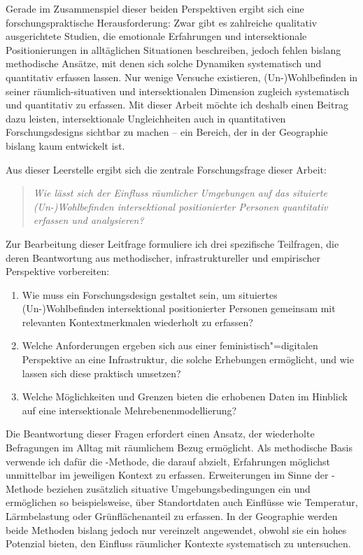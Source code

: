 Gerade im Zusammenspiel dieser beiden Perspektiven ergibt sich eine forschungspraktische Herausforderung: Zwar gibt es zahlreiche qualitativ ausgerichtete Studien, die emotionale Erfahrungen und intersektionale Positionierungen in alltäglichen Situationen beschreiben, jedoch fehlen bislang methodische Ansätze, mit denen sich solche Dynamiken systematisch und quantitativ erfassen lassen. Nur wenige Versuche existieren,  (Un\nobreakdash-)Wohl\-be\-find\-en in seiner räumlich-situativen und intersektionalen Dimension zugleich systematisch und quantitativ zu erfassen. Mit dieser Arbeit möchte ich deshalb einen Beitrag dazu leisten, intersektionale Ungleichheiten auch in quantitativen Forschungsdesigns sichtbar zu machen -- ein Bereich, der in der Geographie bislang kaum entwickelt ist.

\vspace{1em}

Aus dieser Leerstelle ergibt sich die zentrale Forschungsfrage dieser Arbeit:
\begin{quote}
\emph{Wie lässt sich der Einfluss räumlicher Umgebungen auf das situierte (Un\nobreakdash-)Wohl\-be\-find\-en intersektional positionierter Personen quantitativ erfassen und analysieren?}
\end{quote}

Zur Bearbeitung dieser Leitfrage formuliere ich drei spezifische Teilfragen, die deren Beantwortung aus methodischer, infrastruktureller und empirischer Perspektive vorbereiten:

\begin{enumerate}
    \item Wie muss ein Forschungsdesign gestaltet sein, um situiertes (Un\nobreakdash-)Wohl\-be\-find\-en intersektional positionierter Personen gemeinsam mit relevanten Kontextmerkmalen wiederholt zu erfassen?
    \item Welche Anforderungen ergeben sich aus einer feministisch"=digitalen Perspektive an eine Infrastruktur, die solche Erhebungen ermöglicht, und wie lassen sich diese praktisch umsetzen?
    \item Welche Möglichkeiten und Grenzen bieten die erhobenen Daten im Hinblick auf eine intersektionale Mehrebenenmodellierung?
\end{enumerate}

Die Beantwortung dieser Fragen erfordert einen Ansatz, der wiederholte Befragungen im Alltag mit räumlichem Bezug ermöglicht. Als methodische Basis verwende ich dafür die -Methode, die darauf abzielt, Erfahrungen möglichst unmittelbar im jeweiligen Kontext zu erfassen. Erweiterungen im Sinne der -Methode beziehen zusätzlich situative Umgebungsbedingungen ein und ermöglichen so beispielsweise, über Standortdaten auch Einflüsse wie Temperatur, Lärmbelastung oder Grünflächenanteil zu erfassen. In der Geographie werden beide Methoden bislang jedoch nur vereinzelt angewendet, obwohl sie ein hohes Potenzial bieten, den Einfluss räumlicher Kontexte systematisch zu untersuchen.

